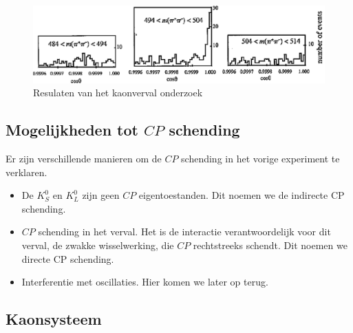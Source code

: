 \documentclass[../main.tex]{subfiles}
\begin{document}
\begin{figure}[h]
    \centering
    \includegraphics[width=0.8\linewidth]{cp_violation/kaon_verval_exp_res.png}
    \caption{Resulaten van het kaonverval onderzoek}%
    \label{fig:cp_violation/kaon_verval_exp_res}
\end{figure}

\subsection{Mogelijkheden tot $CP$ schending}%
\label{sub:mogelijkheden_tot_cp_schending}

Er zijn verschillende manieren om de $CP$ schending in het vorige experiment te verklaren.
\begin{itemize}
    \item De $K_S^0$ en $K_L^0$ zijn geen $CP$ eigentoestanden. Dit noemen we de indirecte CP schending.
    \item $CP$ schending in het verval. Het is de interactie verantwoordelijk voor dit verval, de zwakke wisselwerking, die $CP$ rechtstreeks schendt. Dit noemen we directe CP schending.
    \item Interferentie met oscillaties. Hier komen we later op terug.
\end{itemize}

\subsection{Kaonsysteem}%
\label{sub:kaon_systeem}
\end{document}
